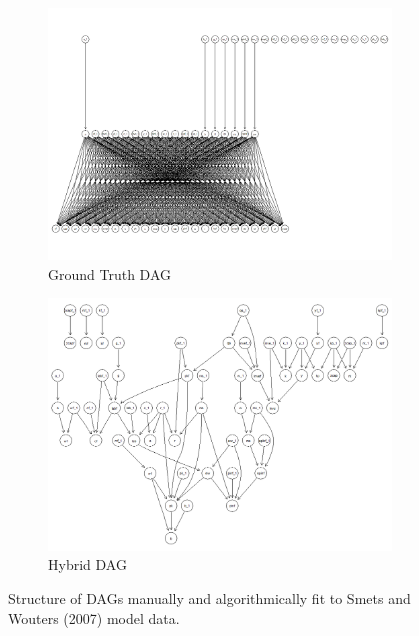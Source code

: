 \documentclass{article}
\begin{document}
\begin{figure}

  \centering
  \begin{subfigure}{0.6\textwidth}
    \centering
    \includegraphics[width=\linewidth]{images/sw_gt_dag.png} 
    \caption{Ground Truth DAG}
    \label{sw_gtdag}
  \end{subfigure}
  \begin{subfigure}{0.6\textwidth}
    \centering  
    \includegraphics[width=\linewidth]{images/sw_hybrid_51_dag.png}
    \caption{Hybrid DAG}
    \label{sw_hdag}
  \end{subfigure}

  \caption{Structure of DAGs manually and algorithmically fit to Smets and Wouters (2007) model data.}
  \label{swdags}
\end{figure}
\end{document}
